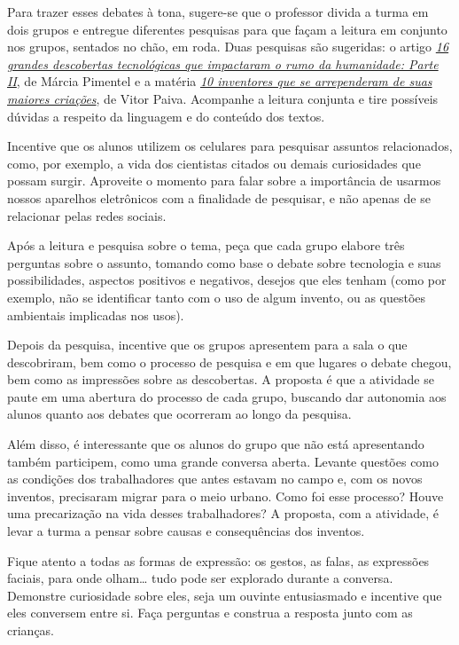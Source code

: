 \documentclass[11pt]{extarticle}
\begin{document}
Para trazer esses debates à tona, sugere-se que o professor divida a turma em dois grupos e entregue diferentes pesquisas para que façam a leitura em conjunto nos grupos, sentados no chão, em roda. Duas pesquisas são sugeridas: o artigo \href{http://multirio.rio.rj.gov.br/index.php/leia/reportagens-artigos/reportagens/16755-16-grandes-descobertas-tecnol\%C3\%B3gicas-que-impactaram-o-rumo-da-humanidade-parte-ii}{\textit{16 grandes descobertas tecnológicas que impactaram o rumo da humanidade: Parte II}}, de Márcia Pimentel e a matéria \href{https://www.hypeness.com.br/2017/03/selecao-hypeness-10-inventores-que-se-arrependeram-de-suas-maiores-criacoes/}{\textit{10 inventores que se arrependeram de suas maiores criações}}, de Vitor Paiva. Acompanhe a leitura conjunta e tire possíveis dúvidas a respeito da linguagem  e do conteúdo dos textos. 

Incentive que os alunos utilizem os celulares para pesquisar assuntos relacionados, como, por exemplo, a vida dos cientistas citados ou demais curiosidades que possam surgir. Aproveite o momento para falar sobre a importância de usarmos nossos aparelhos eletrônicos com a finalidade de pesquisar, e não apenas de se relacionar pelas redes sociais. 

Após a leitura e pesquisa sobre o tema, peça que cada grupo elabore três perguntas sobre o assunto, tomando como base o debate sobre tecnologia e suas possibilidades, aspectos positivos e negativos, desejos que eles tenham (como por exemplo, não se identificar tanto com o uso de algum invento, ou as questões ambientais implicadas nos usos). 

Depois da pesquisa, incentive que os grupos apresentem para a sala o que descobriram, bem como o processo de pesquisa e em que lugares o debate chegou, bem como as impressões sobre as descobertas. A proposta é que a atividade se paute em uma abertura do processo de cada grupo, buscando dar autonomia aos alunos quanto aos debates que ocorreram ao longo da pesquisa. 

Além disso, é interessante que os alunos do grupo que não está apresentando também participem, como uma grande conversa aberta. Levante questões como as condições dos trabalhadores que antes estavam no campo e, com os novos inventos, precisaram migrar para o meio urbano. Como foi esse processo? Houve uma precarização na vida desses trabalhadores? A proposta, com a atividade, é levar a turma a pensar sobre causas e consequências dos inventos. 

Fique atento a todas as formas de expressão: os gestos, as falas, as 
expressões faciais, para onde olham\ldots{} tudo pode ser explorado durante a conversa. 
Demonstre curiosidade sobre eles, seja um ouvinte entusiasmado e incentive que eles 
conversem entre si. Faça perguntas e construa a resposta junto com as crianças. 
\end{document}
